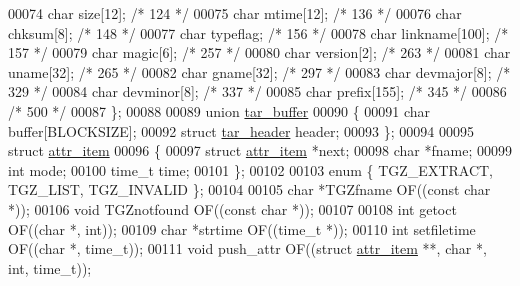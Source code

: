 \begin{DoxyCode}
00074   \textcolor{keywordtype}{char} size[12];                \textcolor{comment}{/* 124 */}
00075   \textcolor{keywordtype}{char} mtime[12];               \textcolor{comment}{/* 136 */}
00076   \textcolor{keywordtype}{char} chksum[8];               \textcolor{comment}{/* 148 */}
00077   \textcolor{keywordtype}{char} typeflag;                \textcolor{comment}{/* 156 */}
00078   \textcolor{keywordtype}{char} linkname[100];           \textcolor{comment}{/* 157 */}
00079   \textcolor{keywordtype}{char} magic[6];                \textcolor{comment}{/* 257 */}
00080   \textcolor{keywordtype}{char} version[2];              \textcolor{comment}{/* 263 */}
00081   \textcolor{keywordtype}{char} uname[32];               \textcolor{comment}{/* 265 */}
00082   \textcolor{keywordtype}{char} gname[32];               \textcolor{comment}{/* 297 */}
00083   \textcolor{keywordtype}{char} devmajor[8];             \textcolor{comment}{/* 329 */}
00084   \textcolor{keywordtype}{char} devminor[8];             \textcolor{comment}{/* 337 */}
00085   \textcolor{keywordtype}{char} prefix[155];             \textcolor{comment}{/* 345 */}
00086                                 \textcolor{comment}{/* 500 */}
00087 \};
00088 
00089 \textcolor{keyword}{union }\hyperlink{uniontar__buffer}{tar\_buffer}
00090 \{
00091   \textcolor{keywordtype}{char}               buffer[BLOCKSIZE];
00092   \textcolor{keyword}{struct }\hyperlink{structtar__header}{tar\_header}  header;
00093 \};
00094 
00095 \textcolor{keyword}{struct }\hyperlink{structattr__item}{attr\_item}
00096 \{
00097   \textcolor{keyword}{struct }\hyperlink{structattr__item}{attr\_item}  *next;
00098   \textcolor{keywordtype}{char}              *fname;
00099   \textcolor{keywordtype}{int}                mode;
00100   time\_t             time;
00101 \};
00102 
00103 \textcolor{keyword}{enum} \{ TGZ\_EXTRACT, TGZ\_LIST, TGZ\_INVALID \};
00104 
00105 \textcolor{keywordtype}{char} *TGZfname          OF((\textcolor{keyword}{const} \textcolor{keywordtype}{char} *));
00106 \textcolor{keywordtype}{void} TGZnotfound        OF((\textcolor{keyword}{const} \textcolor{keywordtype}{char} *));
00107 
00108 \textcolor{keywordtype}{int} getoct              OF((\textcolor{keywordtype}{char} *, \textcolor{keywordtype}{int}));
00109 \textcolor{keywordtype}{char} *strtime           OF((time\_t *));
00110 \textcolor{keywordtype}{int} setfiletime         OF((\textcolor{keywordtype}{char} *, time\_t));
00111 \textcolor{keywordtype}{void} push\_attr          OF((\textcolor{keyword}{struct} \hyperlink{structattr__item}{attr\_item} **, \textcolor{keywordtype}{char} *, \textcolor{keywordtype}{int}, time\_t));

\end{DoxyCode}
